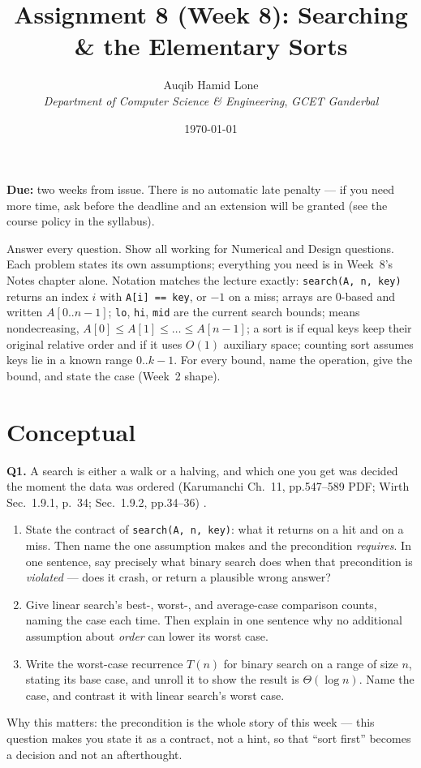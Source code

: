\documentclass[11pt]{article}
\title{Assignment 8 (Week 8): Searching \& the Elementary Sorts}
\author{Auqib Hamid Lone\\[0.3em]
  \emph{Department of Computer Science \& Engineering}, \emph{GCET Ganderbal}}
\date{\today}
\begin{document}
\maketitle

\noindent\textbf{Due:} two weeks from issue. There is no automatic late penalty --- if you need more time, ask before the deadline and an extension will be granted (see the course policy in the syllabus).

\noindent Answer every question. Show all working for Numerical and Design questions. Each problem states its own assumptions; everything you need is in Week~8's Notes chapter alone. Notation matches the lecture exactly: \texttt{search(A, n, key)} returns an index $i$ with \texttt{A[i] == key}, or $-1$ on a miss; arrays are 0-based and written $A[0..n-1]$; \texttt{lo}, \texttt{hi}, \texttt{mid} are the current search bounds;  means nondecreasing, $A[0] \le A[1] \le \dots \le A[n-1]$; a sort is  if equal keys keep their original relative order and  if it uses $O(1)$ auxiliary space; counting sort assumes keys lie in a known range $0..k-1$. For every bound, name the operation, give the bound, and state the case (Week~2 shape).

\section{Conceptual}

\textbf{Q1.} A search is either a walk or a halving, and which one you get was decided the moment the data was ordered (Karumanchi Ch.~11, pp.547--589 PDF; Wirth Sec.~1.9.1, p.~34; Sec.~1.9.2, pp.34--36) \cite{Karumanchi2017_data_structures_algorithms_made_easy,Wirth2004_algorithms_data_structures}.
\begin{enumerate}
  \item[(a)] State the contract of \texttt{search(A, n, key)}: what it returns on a hit and on a miss. Then name the one assumption  makes and the precondition  \emph{requires}. In one sentence, say precisely what binary search does when that precondition is \emph{violated} --- does it crash, or return a plausible wrong answer?
  \item[(b)] Give linear search's best-, worst-, and average-case comparison counts, naming the case each time. Then explain in one sentence why no additional assumption about \emph{order} can lower its worst case.
  \item[(c)] Write the worst-case recurrence $T(n)$ for binary search on a range of size $n$, stating its base case, and unroll it to show the result is $\Theta(\log n)$. Name the case, and contrast it with linear search's worst case.
\end{enumerate}
Why this matters: the precondition is the whole story of this week --- this question makes you state it as a contract, not a hint, so that ``sort first'' becomes a decision and not an afterthought.
\end{document}
